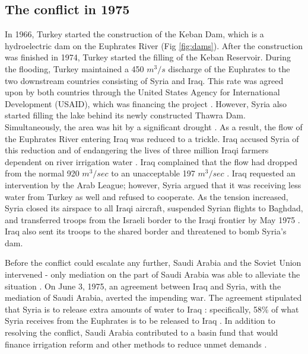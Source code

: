 \documentclass[letterpaper,12pt,titlepage,oneside,final]{book}
\begin{document}
\subsection{The conflict in 1975}
In 1966, Turkey started the construction of the Keban Dam, which is a hydroelectric dam on the Euphrates River (Fig \ref{fig:dams}). After the construction was finished in 1974, Turkey started the filling of the Keban Reservoir. During the flooding, Turkey maintained a 450 $m^3/s$ discharge of the Euphrates to the two downstream countries consisting of Syria and Iraq. This rate was agreed upon by both countries through the United States Agency for International Development (USAID), which was financing the project \citep{inan2000law}. However, Syria also started filling the lake behind its newly constructed Thawra Dam. Simultaneously, the area was hit by a significant drought \citep{kalpakian2004identity}. As a result, the flow of the Euphrates River entering Iraq was reduced to a trickle. Iraq accused Syria of this reduction and of endangering the lives of three million Iraqi farmers dependent on river irrigation water \citep{morris1997water}. Iraq complained that the flow had dropped from the normal 920 $m^3/sec$ to an unacceptable 197 $m^3/sec$ \citep{priscoli2009managing}. Iraq requested an intervention by the Arab League; however, Syria argued that it was receiving less water from Turkey as well and refused to cooperate. As the tension increased, Syria closed its airspace to all Iraqi aircraft, suspended Syrian flights to Baghdad, and transferred troops from the Israeli border to the Iraqi frontier by May 1975 \citep{morris1997water}. Iraq also sent its troops to the shared border and threatened to bomb Syria's dam. 

Before the conflict could escalate any further, Saudi Arabia and the Soviet Union intervened - only mediation on the part of Saudi Arabia was able to alleviate the situation \citep{priscoli2009managing}. On June 3, 1975, an agreement between Iraq and Syria, with the mediation of Saudi Arabia, averted the impending war. The agreement stipulated that Syria is to release extra amounts of water to Iraq \citep{akanda2007tigris}: specifically, 58\% of what Syria receives from the Euphrates is to be released to Iraq \citep{priscoli2009managing}. In addition to resolving the conflict, Saudi Arabia contributed to a basin fund that would finance irrigation reform and other methods to reduce unmet demands \citep{akanda2007tigris}.
\end{document}
